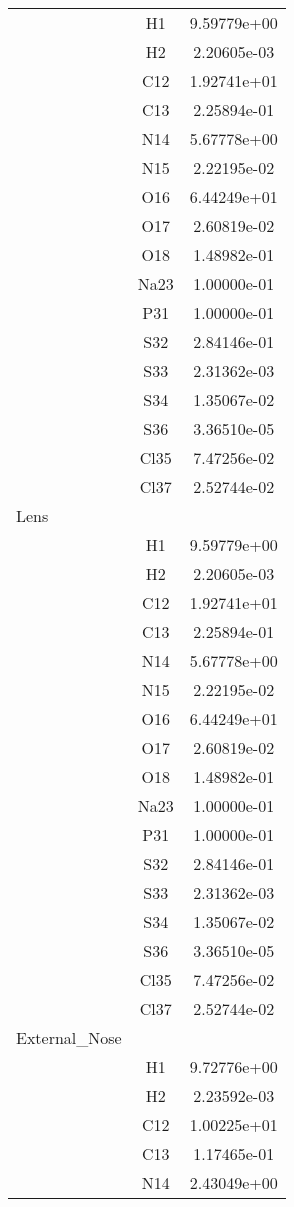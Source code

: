 \begin{centering}
\begin{longtable}{l c c}
\hline
& H1 & 9.59779e+00 \\ 
& H2 & 2.20605e-03 \\ 
& C12 & 1.92741e+01 \\ 
& C13 & 2.25894e-01 \\ 
& N14 & 5.67778e+00 \\ 
& N15 & 2.22195e-02 \\ 
& O16 & 6.44249e+01 \\ 
& O17 & 2.60819e-02 \\ 
& O18 & 1.48982e-01 \\ 
& Na23 & 1.00000e-01 \\ 
& P31 & 1.00000e-01 \\ 
& S32 & 2.84146e-01 \\ 
& S33 & 2.31362e-03 \\ 
& S34 & 1.35067e-02 \\ 
& S36 & 3.36510e-05 \\ 
& Cl35 & 7.47256e-02 \\ 
& Cl37 & 2.52744e-02 \\ 
\hline
Lens & & \\
\hline
& H1 & 9.59779e+00 \\ 
& H2 & 2.20605e-03 \\ 
& C12 & 1.92741e+01 \\ 
& C13 & 2.25894e-01 \\ 
& N14 & 5.67778e+00 \\ 
& N15 & 2.22195e-02 \\ 
& O16 & 6.44249e+01 \\ 
& O17 & 2.60819e-02 \\ 
& O18 & 1.48982e-01 \\ 
& Na23 & 1.00000e-01 \\ 
& P31 & 1.00000e-01 \\ 
& S32 & 2.84146e-01 \\ 
& S33 & 2.31362e-03 \\ 
& S34 & 1.35067e-02 \\ 
& S36 & 3.36510e-05 \\ 
& Cl35 & 7.47256e-02 \\ 
& Cl37 & 2.52744e-02 \\ 
\hline
External_Nose & & \\
\hline
& H1 & 9.72776e+00 \\ 
& H2 & 2.23592e-03 \\ 
& C12 & 1.00225e+01 \\ 
& C13 & 1.17465e-01 \\ 
& N14 & 2.43049e+00 \\ 

\end{longtable}
\end{centering}
